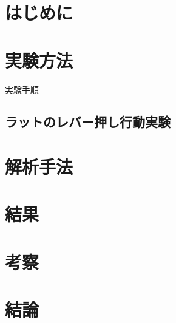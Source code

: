 \chapter{はじめに}
\chapter{実験方法}
実験手順
\section{ラットのレバー押し行動実験}

\chapter{解析手法}
\chapter{結果}
\chapter{考察}
\chapter{結論}
\newpage
